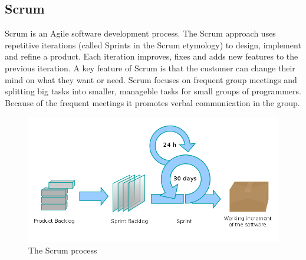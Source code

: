 \subsection{Scrum}
Scrum is an Agile software development process. The Scrum approach uses repetitive iterations (called
 Sprints in the Scrum etymology) to design, implement and refine a product. Each iteration improves,
fixes and adds new features to the previous iteration. A key feature of Scrum is that the customer
can change their mind on what they want or need. Scrum focuses on frequent group meetings and
splitting big tasks into smaller, manageble tasks for small groups of programmers. Because of the
frequent meetings it promotes verbal communication in the group.
\begin{figure}[h!]
\centering \includegraphics[scale=0.4]{img/designmodel-scrum} \caption{The Scrum process}
\label{fig:desigmodel-scrum}
\end{figure}

